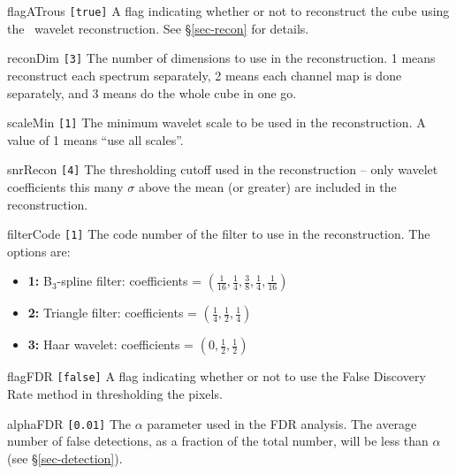 \begin{entry}
\item [flagATrous \texttt{[true]}] A flag indicating whether or not to
  reconstruct the cube using the \atrous\ wavelet
  reconstruction. See \S\ref{sec-recon} for details.
\item[reconDim \texttt{[3]}] The number of dimensions to use in the
  reconstruction. 1 means reconstruct each spectrum separately, 2
  means each channel map is done separately, and 3 means do the whole
  cube in one go.
\item[scaleMin \texttt{[1]}] The minimum wavelet scale to be used in the
  reconstruction. A value of 1 means ``use all scales''.
\item[snrRecon \texttt{[4]}] The thresholding cutoff used in the
  reconstruction -- only wavelet coefficients this many $\sigma$ above
  the mean (or greater) are included in the reconstruction. 
\item[filterCode \texttt{[1]}] The code number of the filter to use in
  the reconstruction. The options are:
  \begin{itemize}
  \item \textbf{1:} B$_3$-spline filter: coefficients = 
    $(\frac{1}{16}, \frac{1}{4}, \frac{3}{8}, \frac{1}{4}, \frac{1}{16})$
  \item \textbf{2:} Triangle filter: coefficients = 
    $(\frac{1}{4}, \frac{1}{2}, \frac{1}{4})$
  \item \textbf{3:} Haar wavelet: coefficients = 
    $(0, \frac{1}{2}, \frac{1}{2})$
  \end{itemize}
\end{entry}

\begin{entry}
\item[flagFDR \texttt{[false]}] A flag indicating whether or not to use
  the False Discovery Rate method in thresholding the pixels.
\item[alphaFDR \texttt{[0.01]}] The $\alpha$ parameter used in the FDR
analysis. The average number of false detections, as a fraction of the
total number, will be less than $\alpha$ (see \S\ref{sec-detection}).
\end{entry}

